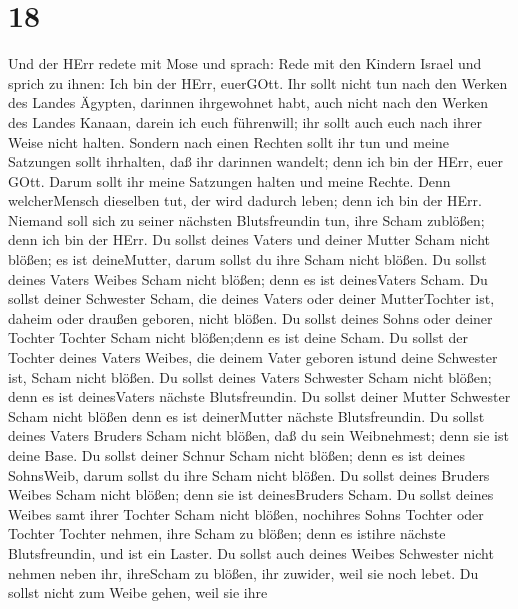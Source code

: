 \hypertarget{section-17}{%
\section{18}\label{section-17}}

 Und der HErr redete mit Mose und sprach:  Rede
mit den Kindern Israel und sprich zu ihnen: Ich bin der HErr, euerGOtt.
 Ihr sollt nicht tun nach den Werken des Landes Ägypten,
darinnen ihrgewohnet habt, auch nicht nach den Werken des Landes Kanaan,
darein ich euch führenwill; ihr sollt auch euch nach ihrer Weise nicht
halten.  Sondern nach einen Rechten sollt ihr tun und meine
Satzungen sollt ihrhalten, daß ihr darinnen wandelt; denn ich bin der
HErr, euer GOtt.  Darum sollt ihr meine Satzungen halten und
meine Rechte. Denn welcherMensch dieselben tut, der wird dadurch leben;
denn ich bin der HErr.  Niemand soll sich zu seiner nächsten
Blutsfreundin tun, ihre Scham zublößen; denn ich bin der HErr.
 Du sollst deines Vaters und deiner Mutter Scham nicht
blößen; es ist deineMutter, darum sollst du ihre Scham nicht blößen.
 Du sollst deines Vaters Weibes Scham nicht blößen; denn es
ist deinesVaters Scham.  Du sollst deiner Schwester Scham,
die deines Vaters oder deiner MutterTochter ist, daheim oder draußen
geboren, nicht blößen.  Du sollst deines Sohns oder deiner
Tochter Tochter Scham nicht blößen;denn es ist deine Scham.
 Du sollst der Tochter deines Vaters Weibes, die deinem
Vater geboren istund deine Schwester ist, Scham nicht blößen.
 Du sollst deines Vaters Schwester Scham nicht blößen; denn
es ist deinesVaters nächste Blutsfreundin.  Du sollst
deiner Mutter Schwester Scham nicht blößen denn es ist deinerMutter
nächste Blutsfreundin.  Du sollst deines Vaters Bruders
Scham nicht blößen, daß du sein Weibnehmest; denn sie ist deine Base.
 Du sollst deiner Schnur Scham nicht blößen; denn es ist
deines SohnsWeib, darum sollst du ihre Scham nicht blößen. 
Du sollst deines Bruders Weibes Scham nicht blößen; denn sie ist
deinesBruders Scham.  Du sollst deines Weibes samt ihrer
Tochter Scham nicht blößen, nochihres Sohns Tochter oder Tochter Tochter
nehmen, ihre Scham zu blößen; denn es istihre nächste Blutsfreundin, und
ist ein Laster.  Du sollst auch deines Weibes Schwester
nicht nehmen neben ihr, ihreScham zu blößen, ihr zuwider, weil sie noch
lebet.  Du sollst nicht zum Weibe gehen, weil sie ihre
